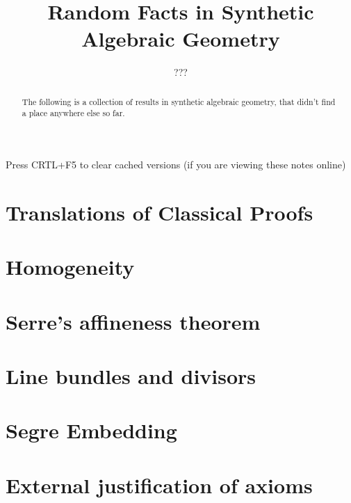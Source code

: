 \documentclass{../util/zariski}
\title{Random Facts in Synthetic Algebraic Geometry}
\author{???}
\begin{document}
\maketitle

\begin{center}
  \color{purple}
  \large{Press CRTL+F5 to clear cached versions}
  \large{(if you are viewing these notes online)}
\end{center}

\begin{abstract}
  The following is a collection of results in synthetic algebraic geometry,
  that didn't find a place anywhere else so far.
\end{abstract}

\tableofcontents

\section{Translations of Classical Proofs}


\section{Homogeneity}


\section{Serre's affineness theorem}


\section{Line bundles and divisors}


\section{Segre Embedding}


\section{External justification of axioms}


\printindex

\printbibliography
\end{document}
